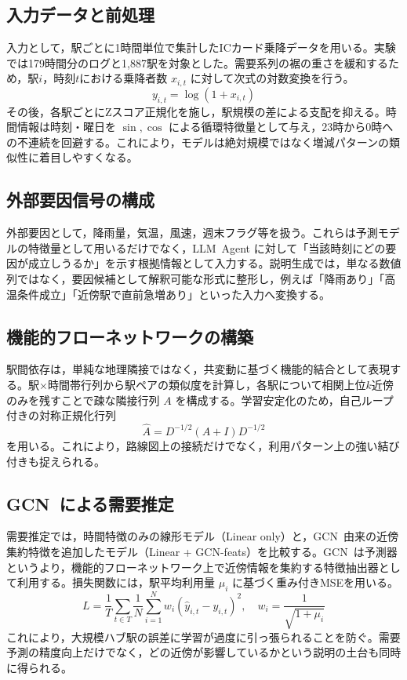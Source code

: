 \documentclass[technicalreport]{ieicej}
\newcommand{\LLM}{LLM}
\newcommand{\GCN}{GCN}
\begin{document}
\subsection{入力データと前処理}
入力として，駅ごとに1時間単位で集計したICカード乗降データを用いる。実験では179時間分のログと1,887駅を対象とした。需要系列の裾の重さを緩和するため，駅$i$，時刻$t$における乗降者数 $x_{i,t}$ に対して次式の対数変換を行う。
\begin{equation}
y_{i,t}=\log(1+x_{i,t})
\label{eq:log1p}
\end{equation}
その後，各駅ごとにZスコア正規化を施し，駅規模の差による支配を抑える。時間情報は時刻・曜日を $\sin,\cos$ による循環特徴量として与え，23時から0時への不連続を回避する。これにより，モデルは絶対規模ではなく増減パターンの類似性に着目しやすくなる。

\subsection{外部要因信号の構成}
外部要因として，降雨量，気温，風速，週末フラグ等を扱う。これらは予測モデルの特徴量として用いるだけでなく，\LLM\ Agent に対して「当該時刻にどの要因が成立しうるか」を示す根拠情報として入力する。説明生成では，単なる数値列ではなく，要因候補として解釈可能な形式に整形し，例えば「降雨あり」「高温条件成立」「近傍駅で直前急増あり」といった入力へ変換する。

\subsection{機能的フローネットワークの構築}
駅間依存は，単純な地理隣接ではなく，共変動に基づく機能的結合として表現する。駅$\times$時間帯行列から駅ペアの類似度を計算し，各駅について相関上位$k$近傍のみを残すことで疎な隣接行列 $A$ を構成する。学習安定化のため，自己ループ付きの対称正規化行列
\begin{equation}
\hat{A}=D^{-1/2}(A+I)D^{-1/2}
\label{eq:adj}
\end{equation}
を用いる。これにより，路線図上の接続だけでなく，利用パターン上の強い結び付きも捉えられる。

\subsection{\GCN\ による需要推定}
需要推定では，時間特徴のみの線形モデル（Linear only）と，\GCN\ 由来の近傍集約特徴を追加したモデル（Linear + GCN-feats）を比較する。\GCN\ は予測器というより，機能的フローネットワーク上で近傍情報を集約する特徴抽出器として利用する。損失関数には，駅平均利用量 $\mu_i$ に基づく重み付きMSEを用いる。
\begin{equation}
L=\frac{1}{T}\sum_{t\in T}\frac{1}{N}\sum_{i=1}^{N} w_i(\hat{y}_{i,t}-y_{i,t})^2,
\quad
w_i=\frac{1}{\sqrt{1+\mu_i}}
\label{eq:wmse}
\end{equation}
これにより，大規模ハブ駅の誤差に学習が過度に引っ張られることを防ぐ。需要予測の精度向上だけでなく，どの近傍が影響しているかという説明の土台も同時に得られる。
\end{document}
